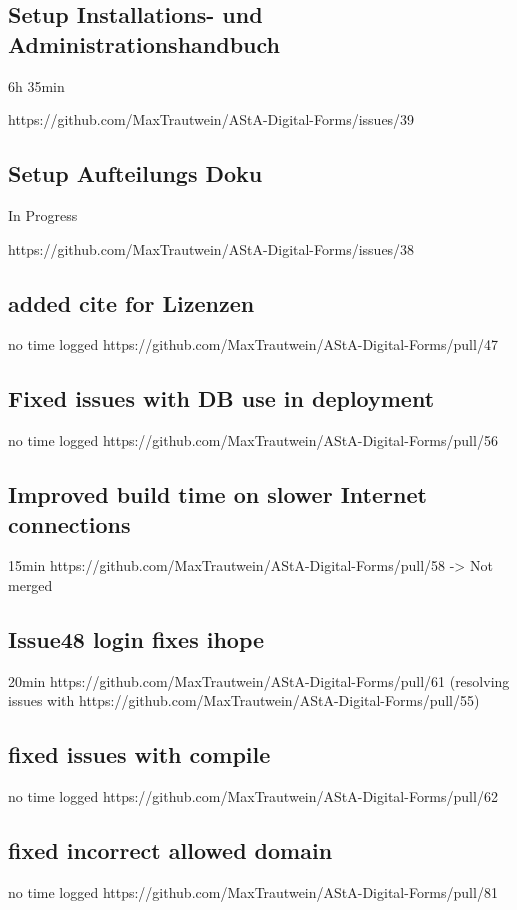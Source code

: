 \subsection{Setup Installations- und Administrationshandbuch}
6h 35min

https://github.com/MaxTrautwein/AStA-Digital-Forms/issues/39
\subsection{Setup Aufteilungs Doku}
In Progress

https://github.com/MaxTrautwein/AStA-Digital-Forms/issues/38

\subsection{added cite for Lizenzen}
no time logged
https://github.com/MaxTrautwein/AStA-Digital-Forms/pull/47

\subsection{Fixed issues with DB use in deployment}
no time logged
https://github.com/MaxTrautwein/AStA-Digital-Forms/pull/56

\subsection{Improved build time on slower Internet connections}
15min
https://github.com/MaxTrautwein/AStA-Digital-Forms/pull/58
-> Not merged

\subsection{Issue48 login fixes ihope}
20min
https://github.com/MaxTrautwein/AStA-Digital-Forms/pull/61
(resolving issues with https://github.com/MaxTrautwein/AStA-Digital-Forms/pull/55)

\subsection{fixed issues with compile}
no time logged
https://github.com/MaxTrautwein/AStA-Digital-Forms/pull/62

\subsection{fixed incorrect allowed domain}
no time logged
https://github.com/MaxTrautwein/AStA-Digital-Forms/pull/81


